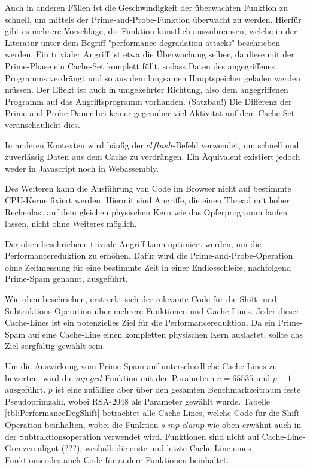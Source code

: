 Auch in anderen Fällen ist die Geschwindigkeit der überwachten Funktion zu schnell, um mittels der Prime-and-Probe-Funktion überwacht zu werden.
Hierfür gibt es mehrere Vorschläge, die Funktion künstlich auszubremsen, welche in der Literatur \cite{MemoryLockingWu,MemoryLockingRisenpart,MemoryLockingJavaAndroid} unter dem Begriff "performance degradation attacks" beschrieben werden.
Ein trivialer Angriff ist etwa die Überwachung selber, da diese mit der Prime-Phase ein Cache-Set komplett füllt, sodass Daten des angegriffenes Programms verdrängt und so aus dem langsamen Hauptspeicher geladen werden müssen.
Der Effekt ist auch in umgekehrter Richtung, also dem angegriffenen Programm auf das Angriffsprogramm vorhanden. (Satzbau!)
Die Differenz der Prime-and-Probe-Dauer bei keiner gegenüber viel Aktivität auf dem Cache-Set veranschaulicht dies.

In anderen Kontexten wird häufig der $clflush$-Befehl verwendet, um schnell und zuverlässig Daten aus dem Cache zu verdrängen. 
Ein Äquivalent existiert jedoch weder in Javascript noch in Webassembly.

Des Weiteren kann die Ausführung von Code im Browser nicht auf bestimmte CPU-Kerne fixiert werden. Hiermit sind Angriffe, die einen Thread mit hoher Rechenlast auf dem gleichen physischen Kern wie das Opferprogramm laufen lassen, nicht ohne Weiteres möglich.

Der oben beschriebene triviale Angriff kann optimiert werden, um die Performancereduktion zu erhöhen. Dafür wird die Prime-and-Probe-Operation ohne Zeitmessung für eine bestimmte Zeit in einer Endlosschleife, nachfolgend Prime-Spam genannt, ausgeführt. 

Wie oben beschrieben, erstreckt sich der relevante Code für die Shift- und Subtraktions-Operation über mehrere Funktionen und Cache-Lines.
Jeder dieser Cache-Lines ist ein potenzielles Ziel für die Performancereduktion.
Da ein Prime-Spam auf eine Cache-Line einen kompletten physischen Kern auslastet, sollte das Ziel sorgfältig gewählt sein.

Um die Auswirkung vom Prime-Spam auf unterschiedliche Cache-Lines zu bewerten, wird die $mp\_gcd$-Funktion mit den Parametern $e=65535$ und $p-1$ ausgeführt.
$p$ ist eine zufällige aber über den gesamten Benchmarkzeitraum feste Pseudoprimzahl, wobei RSA-2048 als Parameter gewählt wurde.
Tabelle \ref{tbl:PerformanceDegShift} betrachtet alle Cache-Lines, welche Code für die Shift-Operation beinhalten, wobei die Funktion $s\_mp\_clamp$ wie oben erwähnt auch in der Subtraktionsoperation verwendet wird.
Funktionen sind nicht auf Cache-Line-Grenzen alignt (???), weshalb die erste und letzte Cache-Line eines Funktionscodes auch Code für andere Funktionen beinhaltet.


